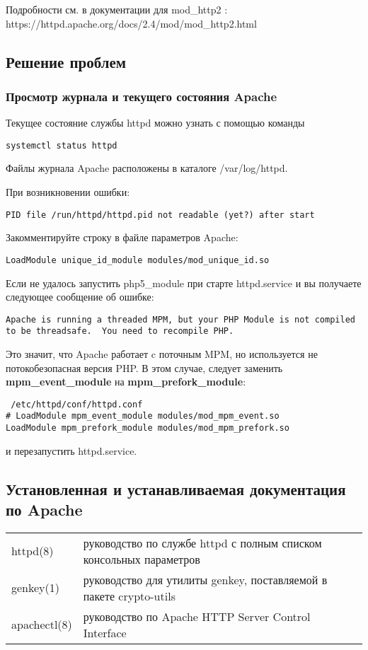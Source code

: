 \documentclass[a4paper,10pt,twoside]{article}
\begin{document}
Подробности см. в документации для mod\_http2 : https://httpd.apache.org/docs/2.4/mod/mod\_http2.html

\subsection{Решение проблем}
\subsubsection{Просмотр журнала и текущего состояния Apache}
Текущее состояние службы httpd можно узнать с помощью команды
\begin{verbatim}
systemctl status httpd
\end{verbatim} 

Файлы журнала Apache расположены в каталоге /var/log/httpd.

При возникновении ошибки:
\begin{verbatim}
PID file /run/httpd/httpd.pid not readable (yet?) after start
\end{verbatim} 
Закомментируйте строку в файле параметров Apache:
\begin{verbatim}
LoadModule unique_id_module modules/mod_unique_id.so
\end{verbatim} 


Если не удалось запустить php5\_module при старте httpd.service и вы получаете следующее сообщение об ошибке:
\begin{verbatim}
Apache is running a threaded MPM, but your PHP Module is not compiled to be threadsafe.  You need to recompile PHP.                                                                                                                   \end{verbatim} 
Это значит, что Apache работает c поточным MPM, но используется не потокобезопасная версия PHP. В этом случае, следует заменить \textbf{mpm\_event\_module} на \textbf{mpm\_prefork\_module}:
\begin{verbatim}
 /etc/httpd/conf/httpd.conf
# LoadModule mpm_event_module modules/mod_mpm_event.so
LoadModule mpm_prefork_module modules/mod_mpm_prefork.so
\end{verbatim} 
и перезапустить httpd.service.



\subsection{Установленная и устанавливаемая документация по Apache}
\begin{longtable}{  m{3cm}  m{10cm}  }  
httpd(8) & руководство по службе httpd с полным списком консольных параметров\\
genkey(1) & руководство для утилиты genkey, поставляемой в пакете crypto-utils\\
apachectl(8) & руководство по Apache HTTP Server Control Interface\\
\end{longtable}
\end{document}
